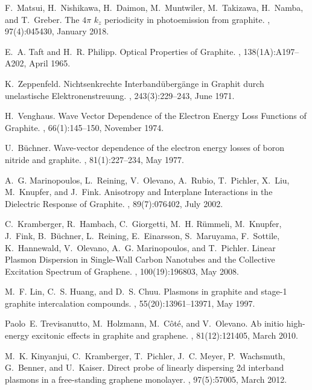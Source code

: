 \documentclass[aps,prb,10pt,showpacs,superscriptaddress,twocolumn,notitlepage]{revtex4-1}
\begin{document}
\begin{thebibliography}{10}
F.~Matsui, H.~Nishikawa, H.~Daimon, M.~Muntwiler, M.~Takizawa, H.~Namba, and
  T.~Greber.
\newblock The {$4\pi$} {$k_{z}$} periodicity in photoemission from graphite.
, 97(4):045430, January 2018.

E.~A. Taft and H.~R. Philipp.
\newblock Optical {Properties} of {Graphite}.
, 138(1A):A197--A202, April 1965.

K.~Zeppenfeld.
\newblock Nichtsenkrechte {Interband{\"u}berg{\"a}nge} in {Graphit} durch
  unelastische {Elektronenstreuung}.
,
  243(3):229--243, June 1971.

H.~Venghaus.
\newblock Wave {Vector} {Dependence} of the {Electron} {Energy} {Loss}
  {Functions} of {Graphite}.
, 66(1):145--150, November 1974.

U.~Büchner.
\newblock Wave-vector dependence of the electron energy losses of boron nitride
  and graphite.
, 81(1):227--234, May 1977.

A.~G. Marinopoulos, L.~Reining, V.~Olevano, A.~Rubio, T.~Pichler, X.~Liu,
  M.~Knupfer, and J.~Fink.
\newblock Anisotropy and {Interplane} {Interactions} in the {Dielectric}
  {Response} of {Graphite}.
, 89(7):076402, July 2002.

C.~Kramberger, R.~Hambach, C.~Giorgetti, M.~H. R{\"u}mmeli, M.~Knupfer,
  J.~Fink, B.~B{\"u}chner, L.~Reining, E.~Einarsson, S.~Maruyama, F.~Sottile,
  K.~Hannewald, V.~Olevano, A.~G. Marinopoulos, and T.~Pichler.
\newblock Linear {Plasmon} {Dispersion} in {Single}-{Wall} {Carbon} {Nanotubes}
  and the {Collective} {Excitation} {Spectrum} of {Graphene}.
, 100(19):196803, May 2008.

M.~F. Lin, C.~S. Huang, and D.~S. Chuu.
\newblock Plasmons in graphite and stage-1 graphite intercalation compounds.
, 55(20):13961--13971, May 1997.

Paolo~E. Trevisanutto, M.~Holzmann, M.~C{\^o}t{\'e}, and V.~Olevano.
\newblock Ab initio high-energy excitonic effects in graphite and graphene.
, 81(12):121405, March 2010.

M.~K. Kinyanjui, C.~Kramberger, T.~Pichler, J.~C. Meyer, P.~Wachsmuth,
  G.~Benner, and U.~Kaiser.
\newblock Direct probe of linearly dispersing 2d interband plasmons in a
  free-standing graphene monolayer.
, 97(5):57005, March 2012.


\end{thebibliography}
\end{document}
